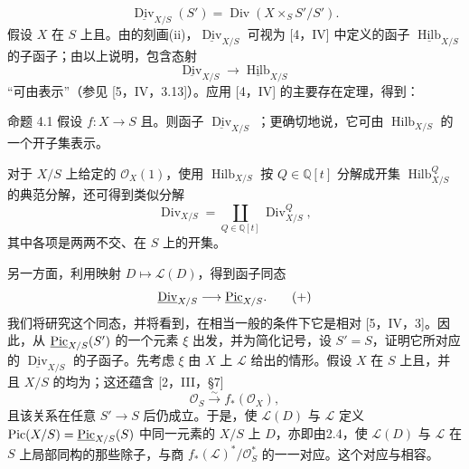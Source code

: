 \[\underline{\operatorname{Div}}_{X/S}(S')=\operatorname{Div}(X\times_S S'/S').\]
假设 $X$ 在 $S$ 上且。由的刻画(ii)，$\underline{\operatorname{Div}}_{X/S}$ 可视为 [4，IV] 中定义的函子 $\underline{\operatorname{Hilb}}_{X/S}$ 的子函子；由以上说明，包含态射
\[\underline{\operatorname{Div}}_{X/S}\longrightarrow\underline{\operatorname{Hilb}}_{X/S}\]
“可由表示”（参见 [5，IV，3.13]）。应用 [4，IV] 的主要存在定理，得到：
\begin{statement}{命题 4.1}
假设 $f:X\to S$ 且。则函子 $\underline{\operatorname{Div}}_{X/S}$ ；更确切地说，它可由 $\operatorname{Hilb}_{X/S}$ 的一个开子集表示。
\end{statement}
对于 $X/S$ 上给定的 $\mathcal O_X(1)$，使用 $\operatorname{Hilb}_{X/S}$ 按  $Q\in\mathbb Q[t]$ 分解成开集 $\operatorname{Hilb}^Q_{X/S}$ 的典范分解，还可得到类似分解
\[\operatorname{Div}_{X/S}=\coprod_{Q\in\mathbb Q[t]}\operatorname{Div}^Q_{X/S},\]
其中各项是两两不交、在 $S$ 上的开集。

另一方面，利用映射 $D\mapsto\mathcal L(D)$，得到函子同态
\[\underline{\operatorname{Div}}_{X/S}\longrightarrow\underline{\operatorname{Pic}}_{X/S}.\tag{+}\]
我们将研究这个同态，并将看到，在相当一般的条件下它是相对 [5，IV，3]。因此，从 $\underline{\operatorname{Pic}}_{X/S}(S')$ 的一个元素 $\xi$ 出发，并为简化记号，设 $S'=S$，证明它所对应的 $\underline{\operatorname{Div}}_{X/S}$ 的子函子。先考虑 $\xi$ 由 $X$ 上 $\mathcal L$ 给出的情形。假设 $X$ 在 $S$ 上且，并且 $X/S$ 的均为；这还蕴含 [2，III，§7]
\[\mathcal O_S\xrightarrow{\sim}f_*(\mathcal O_X),\]
且该关系在任意 $S'\to S$ 后仍成立。于是，使 $\mathcal L(D)$ 与 $\mathcal L$ 定义 $\operatorname{Pic}(X/S)=\underline{\operatorname{Pic}}_{X/S}(S)$ 中同一元素的 $X/S$ 上 $D$，亦即由2.4，使 $\mathcal L(D)$ 与 $\mathcal L$ 在 $S$ 上局部同构的那些除子，与商 $f_*(\mathcal L)^*/\mathcal O_S^*$ 的一一对应。这个对应与相容。

